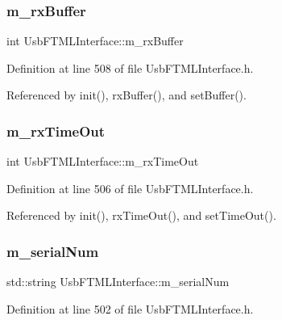 \subsubsection{\texorpdfstring{m\+\_\+rx\+Buffer}{m\_rxBuffer}}
{\footnotesize\ttfamily int Usb\+F\+T\+M\+L\+Interface\+::m\+\_\+rx\+Buffer\hspace{0.3cm}{\ttfamily [private]}}



Definition at line 508 of file Usb\+F\+T\+M\+L\+Interface.\+h.



Referenced by init(), rx\+Buffer(), and set\+Buffer().

\mbox{\label{classUsbFTMLInterface_a4e3a413912cb5f61b5885c0d22e6c179}} 
\subsubsection{\texorpdfstring{m\+\_\+rx\+Time\+Out}{m\_rxTimeOut}}
{\footnotesize\ttfamily int Usb\+F\+T\+M\+L\+Interface\+::m\+\_\+rx\+Time\+Out\hspace{0.3cm}{\ttfamily [private]}}



Definition at line 506 of file Usb\+F\+T\+M\+L\+Interface.\+h.



Referenced by init(), rx\+Time\+Out(), and set\+Time\+Out().

\mbox{\label{classUsbFTMLInterface_a389d847226de3203f7331ab8509c442c}} 
\subsubsection{\texorpdfstring{m\+\_\+serial\+Num}{m\_serialNum}}
{\footnotesize\ttfamily std\+::string Usb\+F\+T\+M\+L\+Interface\+::m\+\_\+serial\+Num\hspace{0.3cm}{\ttfamily [private]}}



Definition at line 502 of file Usb\+F\+T\+M\+L\+Interface.\+h.



